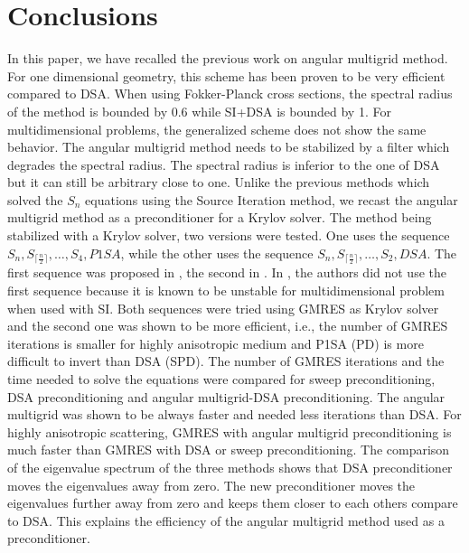 \section{Conclusions}
In this paper, we have recalled the previous work on angular multigrid
method. For one dimensional geometry, this scheme has been proven to be very 
efficient compared to DSA. When using Fokker-Planck cross sections, the
spectral radius of the method is bounded by 0.6 while SI+DSA is bounded by 1. 
For multidimensional problems, the generalized scheme does
not show the same behavior. The angular multigrid method needs to be
stabilized
by a filter which degrades the spectral radius. The spectral radius is inferior 
to the one of DSA but it can still be arbitrary close to one. 
Unlike the previous methods which solved the $S_n$ equations using the Source 
Iteration method, we recast the angular multigrid method as a preconditioner 
for a Krylov solver. The method being stabilized with a Krylov solver, two 
versions were tested. One uses the sequence $S_n,S_{\lceil\frac{n}{2}\rceil},
\hdots,S_4,P1SA$, while the other uses the sequence $S_n,
S_{\lceil\frac{n}{2}\rceil},\hdots,S_2,DSA$.
The first sequence was proposed in \cite{multigrid_1d}, the second in 
\cite{multigrid_2d}. In \cite{multigrid_2d}, the authors did not use the first
sequence because it is known to be unstable for multidimensional problem when 
used with SI. Both sequences were tried using GMRES as Krylov solver and the 
second one was shown to be more 
efficient, i.e., the number of GMRES iterations is smaller for highly 
anisotropic medium and P1SA (PD) is more difficult to invert than
DSA (SPD). The number of GMRES iterations and the time needed
to solve the equations were compared for sweep preconditioning, DSA
preconditioning and angular multigrid-DSA preconditioning. The angular
multigrid was shown to be always faster and needed less iterations than DSA.
For highly anisotropic scattering, GMRES with angular multigrid
preconditioning is much faster than GMRES with DSA or sweep preconditioning.
The comparison of the eigenvalue spectrum of the three methods shows that 
DSA preconditioner moves the eigenvalues away from zero. The new
preconditioner moves the eigenvalues further away from zero and keeps them
closer to each others compare to DSA. This explains the
efficiency of the angular multigrid method used as a preconditioner.
